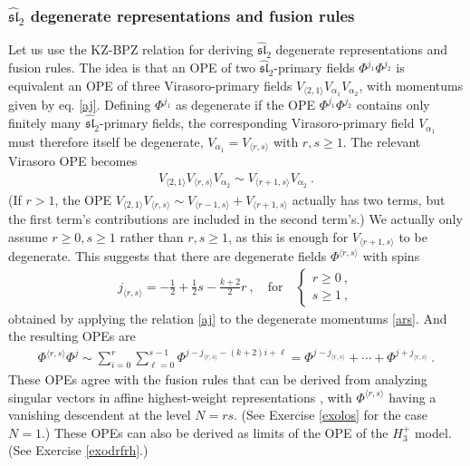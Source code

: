 \documentclass[12pt, a4paper, notitlepage, twoside]{report}
\numberwithin{equation}{section}
\theoremstyle{break}
\begin{document}
\subsubsection{\texorpdfstring{$\widehat{\mathfrak{sl}}_2$}{sl2} degenerate representations and fusion rules}

Let us use the KZ-BPZ relation for deriving $\widehat{\mathfrak{sl}}_2$ degenerate representations and fusion rules. 
The idea is that an OPE of two $\widehat{\mathfrak{sl}}_2$-primary fields $\Phi^{j_1}\Phi^{j_2}$ is equivalent an OPE of three Virasoro-primary fields $V_{\langle 2, 1\rangle}V_{\alpha_1}V_{\alpha_2}$, with momentums given by eq. \eqref{aj}.
Defining $\Phi^{j_1}$ as degenerate if the OPE $\Phi^{j_1}\Phi^{j_2}$ contains only finitely many $\widehat{\mathfrak{sl}}_2$-primary fields, the corresponding Virasoro-primary field $V_{\alpha_1}$ must therefore itself be degenerate, $V_{\alpha_1}=V_{\langle r, s\rangle}$ with $r,s\geq 1$. 
The relevant Virasoro OPE becomes 
\begin{align}
 V_{\langle 2, 1\rangle}V_{\langle r, s\rangle}V_{\alpha_2} \sim V_{\langle r+1, s\rangle}V_{\alpha_2}\ .
\end{align}
(If $r>1$, the OPE $V_{\langle 2, 1\rangle}V_{\langle r, s\rangle}\sim V_{\langle r-1, s\rangle}+ V_{\langle r+1, s\rangle}$ actually has two terms, but the first term's contributions are included in the second term's.)
We actually only assume $r\geq 0,s\geq 1$ rather than $r,s\geq 1$, as this is enough for $V_{\langle r+1, s\rangle}$ to be degenerate.
This suggests that there are degenerate fields $\Phi^{\langle r,s\rangle}$ with spins
\begin{align}
 j_{\langle r,s\rangle} = -\frac12 +\frac12 s -\frac{k+2}{2} r \ , \quad \text{for} \quad \left\{\begin{array}{l} r\geq 0\ , \\ s\geq 1\ , \end{array}\right.
 \label{jrs}
\end{align}
obtained by applying the relation \eqref{aj} to the degenerate momentums \eqref{ars}. And the resulting OPEs are
\begin{align}
 \Phi^{\langle r, s\rangle}\Phi^j \sim 
 \sum_{i=0}^r \sum_{\ell=0}^{s-1} \Phi^{j-j_{\langle r,s\rangle}-(k+2)i+\ell}
 = \Phi^{j-j_{\langle r,s\rangle}} + \cdots + \Phi^{j+j_{\langle r,s\rangle}}\ .
 \label{prspj}
\end{align}
These OPEs agree with the fusion rules that can be derived from analyzing singular vectors in affine highest-weight representations \cite{ay92}, with $\Phi^{\langle r, s\rangle}$ having a vanishing descendent at the level $N=rs$. (See Exercise \ref{exolos} for the case $N=1$.) These OPEs can also be derived as limits of the OPE of the $H_3^+$ model. (See Exercise \ref{exodrfrh}.)
\end{document}
